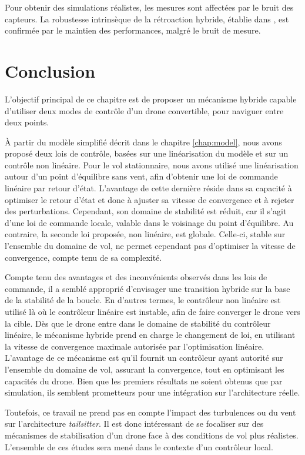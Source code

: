 Pour obtenir des simulations réalistes, les mesures sont affectées par 
le bruit des capteurs. La robustesse intrinsèque de la rétroaction hybride, établie dans \cite[Chapitre 7]{65}, est confirmée par le maintien des performances, malgré le bruit de mesure.

\section{Conclusion}

L'objectif principal de ce chapitre est de proposer un mécanisme hybride capable d'utiliser deux modes de contrôle d'un drone convertible, pour naviguer entre deux points. 

À partir du modèle simplifié décrit dans le chapitre \ref{chap:model}, nous avons proposé deux lois de contrôle, basées sur une linéarisation du modèle et sur un contrôle non linéaire.
Pour le vol stationnaire, nous avons utilisé une linéarisation autour d'un point d'équilibre sans vent, afin d'obtenir une loi de commande linéaire par retour d'état. L'avantage de cette dernière réside dans sa capacité à optimiser le retour d'état et donc à ajuster sa vitesse de convergence et à rejeter des perturbations.  Cependant, son domaine de stabilité est réduit, car il s'agit d'une loi de commande locale, valable dans le voisinage du point d'équilibre. Au contraire, la seconde loi proposée, non linéaire, est globale. Celle-ci, stable sur l'ensemble du domaine de vol, ne permet cependant pas d'optimiser la vitesse de convergence, compte tenu de sa complexité.

Compte tenu des avantages et des inconvénients observés dans les lois de commande, il a semblé approprié d'envisager une transition hybride sur la base de la stabilité de la boucle. En d'autres termes, le contrôleur non linéaire est utilisé là où le contrôleur linéaire est instable, afin de faire converger le drone vers la cible. Dès que le drone entre dans le domaine de stabilité du contrôleur linéaire, le mécanisme hybride prend en charge le changement de loi, en utilisant la vitesse de convergence maximale autorisée par l'optimisation linéaire. L'avantage de ce mécanisme est qu'il fournit un contrôleur ayant autorité sur l'ensemble du domaine de vol, assurant la convergence, tout en optimisant les capacités du drone. Bien que les premiers résultats ne soient obtenus que par simulation, ils semblent prometteurs pour une intégration sur l'architecture réelle.

Toutefois, ce travail ne prend pas en compte l'impact des turbulences ou du vent sur l'architecture \textit{tailsitter}. Il est donc intéressant de se focaliser sur des mécanismes de stabilisation d'un drone face à des conditions de vol plus réalistes. L'ensemble de ces études sera mené dans le contexte d'un contrôleur local.


